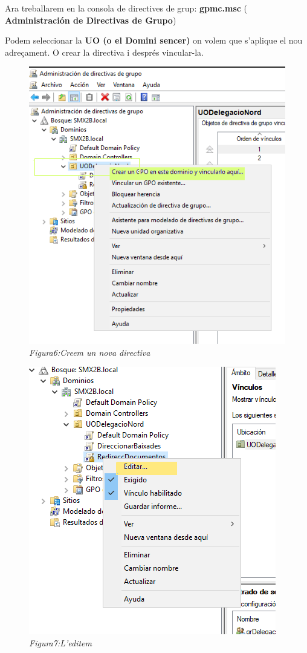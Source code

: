 \documentclass[
  a4paper,
]{article}
\begin{document}
Ara treballarem en la consola de directives de grup: \textbf{gpmc.msc} (
\textbf{Administración de Directivas de Grupo})

Podem seleccionar la \textbf{UO (o el Domini sencer)} on volem que
s'aplique el nou adreçament. O crear la directiva i després vincular-la.

\begin{figure}
\centering
\includegraphics{png/CrearGPORedireccionar.png}
\caption{\emph{Figura6:Creem un nova directiva}}
\end{figure}

\begin{figure}
\centering
\includegraphics{png/EditarGPORedireccionar.png}
\caption{\emph{Figura7:L'editem}}
\end{figure}
\end{document}
